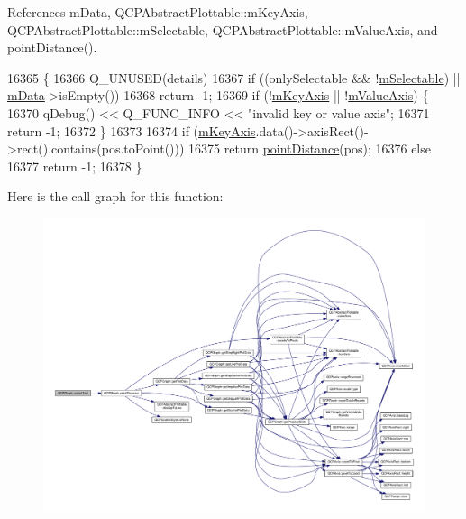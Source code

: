 References m\+Data, Q\+C\+P\+Abstract\+Plottable\+::m\+Key\+Axis, Q\+C\+P\+Abstract\+Plottable\+::m\+Selectable, Q\+C\+P\+Abstract\+Plottable\+::m\+Value\+Axis, and point\+Distance().


\begin{DoxyCode}
16365                                                      \{
16366   Q\_UNUSED(details)
16367   if ((onlySelectable && !\hyperlink{class_q_c_p_abstract_plottable_aceee52342c8e75727abcbd164986fdcb}{mSelectable}) || \hyperlink{class_q_c_p_graph_a8457c840f69a0ac49f61d30a509c5d08}{mData}->isEmpty())
16368     return -1;
16369   if (!\hyperlink{class_q_c_p_abstract_plottable_a426f42e254d0f8ce5436a868c61a6827}{mKeyAxis} || !\hyperlink{class_q_c_p_abstract_plottable_a2901452ca4aea911a1827717934a4bda}{mValueAxis}) \{
16370     qDebug() << Q\_FUNC\_INFO << \textcolor{stringliteral}{"invalid key or value axis"};
16371     \textcolor{keywordflow}{return} -1;
16372   \}
16373 
16374   \textcolor{keywordflow}{if} (\hyperlink{class_q_c_p_abstract_plottable_a426f42e254d0f8ce5436a868c61a6827}{mKeyAxis}.data()->axisRect()->rect().contains(pos.toPoint()))
16375     \textcolor{keywordflow}{return} \hyperlink{class_q_c_p_graph_af93762a12a481a7edb4b3dd9e330dff1}{pointDistance}(pos);
16376   \textcolor{keywordflow}{else}
16377     \textcolor{keywordflow}{return} -1;
16378 \}
\end{DoxyCode}


Here is the call graph for this function\+:\nopagebreak
\begin{figure}[H]
\begin{center}
\leavevmode
\includegraphics[width=350pt]{class_q_c_p_graph_abc9ff375aabcf2d21cca33d6baf85772_cgraph}
\end{center}
\end{figure}


